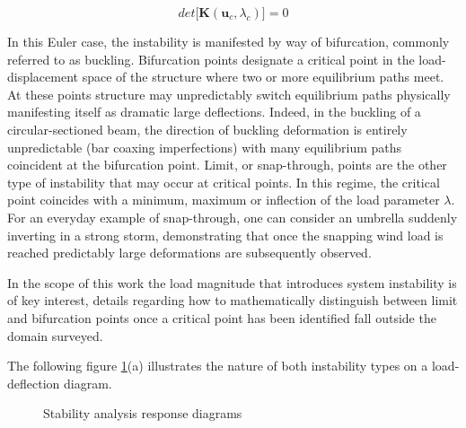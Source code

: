  \begin{equation} 
 det\big[\mathbf{K}(\mathbf{u}_c,\lambda_c)\big] = 0
 \label{eqstab1}
 \end{equation}
 
 In this Euler case, the instability is manifested by way of bifurcation, commonly referred to as buckling. Bifurcation points designate a critical point in the load-displacement space of the structure where two or more equilibrium paths meet. At these points structure may unpredictably switch equilibrium paths physically manifesting itself as dramatic large deflections. Indeed, in the buckling of a circular-sectioned beam, the direction of buckling deformation is entirely unpredictable (bar coaxing imperfections) with many equilibrium paths coincident at the bifurcation point. Limit, or snap-through, points are the other type of instability that may occur at critical points. In this regime, the critical point coincides with a minimum, maximum or inflection of the load parameter $\lambda$. For an everyday example of snap-through, one can consider an umbrella suddenly inverting in a strong storm, demonstrating that once the snapping wind load is reached predictably large deformations are subsequently observed. 
 
 In the scope of this work the load magnitude that introduces system instability is of key interest, details regarding how to mathematically distinguish between limit and bifurcation points once a critical point has been identified fall outside the domain surveyed. 
 
 The following figure \ref{stab1}(a) illustrates the nature of both instability types on a load-deflection diagram.

\begin{figure}[H]
	\caption{\label{stab1}Stability analysis response diagrams \cite{FelippaStabilityBasics2016}}
\end{figure}

